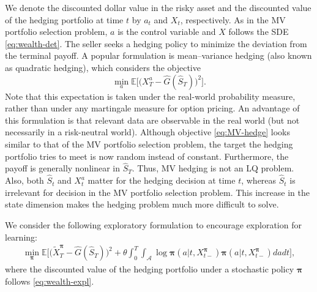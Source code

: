 \documentclass[11pt]{article}
\newcommand{\1}{\mathbbm{1}}
\newcommand{\bpi}{\boldsymbol{\pi}}
\begin{document}
We denote the discounted dollar value in the risky asset and the discounted value of the hedging portfolio at time $t$ by $a_t$ and $X_t$, respectively. As in the MV portfolio selection problem, $a$ is the control variable and $X$ follows the SDE \eqref{eq:wealth-det}. The seller seeks a hedging policy to minimize the deviation from the terminal payoff. A popular formulation is mean--variance hedging (also known as quadratic hedging), which considers the objective
\begin{equation}
	\min_{a}\mathbb{E}\Big[\big(X_{T}^{a}-\hat{G}(\hat{S}_T)\big)^{2}\Big].\label{eq:MV-hedge}
\end{equation}
Note that this expectation is taken under the real-world probability measure, rather than under any martingale measure for option pricing. An advantage of this formulation is that relevant data are observable in the real world (but not necessarily in a risk-neutral world). Although objective \eqref{eq:MV-hedge} looks similar to that of the MV portfolio selection problem, the target the hedging portfolio tries to meet is now random instead of constant. Furthermore, the payoff is generally nonlinear in $\hat{S}_T$. Thus, MV hedging is not an LQ problem. Also, both $\hat{S}_t$ and $X_t^{a}$ matter for the hedging decision at time $t$, whereas $\hat{S}_t$ is irrelevant for decision in the MV portfolio selection problem. This increase in the state dimension makes the hedging problem much more difficult to solve.

We consider the following exploratory formulation to encourage exploration for learning:
\begin{align} \label{eq:MV-hedge-expl}
	\min_{\bpi}\mathbb{E}\bigg[\big(\tilde{X}_{T}^{\bpi}-\hat{G}(\hat{S}_T)\big)^{2} + \theta \int_0^T  \int_{\mathcal{A}}\log \bpi(a|t, X_{t-}^{\bpi}) \bpi(a|t, X_{t-}^{\bpi})dadt\bigg],
\end{align}
where the discounted value of the hedging portfolio under a stochastic policy $\bpi$ follows \eqref{eq:wealth-expl}.
\end{document}
